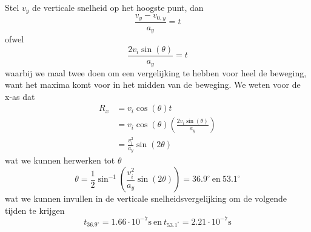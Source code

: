 \begin{description}[labelwidth=1.5cm, leftmargin=!]
        Stel $v_y$ de verticale snelheid op het hoogste punt, dan
        \begin{equation*}
            \frac{v_y-v_{0,y}}{a_y} = t
        \end{equation*}
        ofwel
        \begin{equation*}
            \frac{2v_i\sin(\theta)}{a_y} = t
        \end{equation*}
        waarbij we maal twee doen om een vergelijking te hebben voor heel de beweging, want het maxima komt voor in het midden van de beweging. We weten voor de x-as dat
        \begin{align*}
            R_x 
                &= v_i\cos(\theta)t \\
                &= v_i\cos(\theta)\left( \frac{2v_i\sin(\theta)}{a_y}\right) \\
                &=  \frac{v_i^2}{a_y} \sin(2\theta)
        \end{align*}
        wat we kunnen herwerken tot $\theta$
        \begin{equation*}
            \theta = \frac{1}{2}\sin^{-1}\left(\frac{v_i^2}{a_y} \sin(2\theta)\right) = 36.9^{\circ} \ \text{en} \ 53.1^{\circ} 
        \end{equation*}
        wat we kunnen invullen in de verticale snelheidsvergelijking om de volgende tijden te krijgen
        \begin{equation*}
            t_{36.9^{\circ}} = 1.66 \cdot 10^{-7} \text{s} \ \text{en} \ t_{53.1^{\circ}} = 2.21 \cdot 10^{-7} \text{s}
        \end{equation*}
        
    
\end{description}
